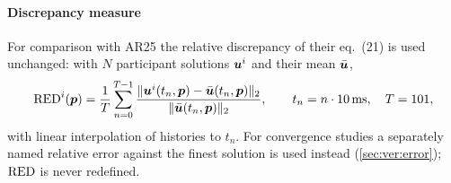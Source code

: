 \paragraph{Discrepancy measure} For comparison with AR25 the relative
discrepancy of their eq.~(21) is used unchanged: with $N$ participant
solutions $\bm{u}^i$ and their mean $\bar{\bm{u}}$,
\begin{equation}
\mathrm{RED}^i(\bm{p}) = \frac{1}{T}\sum_{n=0}^{T-1}
\frac{\|\bm{u}^i(t_n,\bm{p})-\bar{\bm{u}}(t_n,\bm{p})\|_2}{\|\bar{\bm{u}}(t_n,\bm{p})\|_2},
\qquad t_n = n\cdot\SI{10}{ms},\quad T=101,
\end{equation}
with linear interpolation of histories to $t_n$.
For convergence studies a separately named relative error against the
finest solution is used instead (\cref{sec:ver:error}); $\mathrm{RED}$ is never
redefined.
